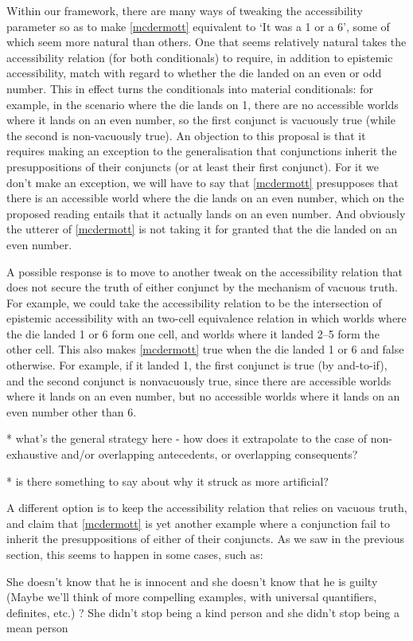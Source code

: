 \documentclass[If.tex]{subfiles}
\begin{document}
\begin{prop}
Within our framework, there are many ways of tweaking the accessibility parameter so as to make \ref{mcdermott} equivalent to ‘It was a 1 or a 6’, some of which seem more natural than others.  One that seems relatively natural takes the accessibility relation (for both conditionals) to require, in addition to epistemic accessibility, match with regard to whether the die landed on an even or odd number.  This in effect turns the conditionals into material conditionals: for example, in the scenario where the die lands on 1, there are no accessible worlds where it lands on an even number, so the first conjunct is vacuously true (while the second is non-vacuously true).  An objection to this proposal is that it requires making an exception to the generalisation that conjunctions inherit the presuppositions of their conjuncts (or at least their first conjunct).  For it we don't make an exception, we will have to say that \ref{mcdermott} presupposes that there is an accessible world where the die lands on an even number, which on the proposed reading entails that it actually lands on an even number.  And obviously the utterer of \ref{mcdermott} is not taking it for granted that the die landed on an even number.  

A possible response is to move to another tweak on the accessibility relation that does not secure the truth of either conjunct by the mechanism of vacuous truth.  For example, we could take the accessibility relation to be the intersection of epistemic accessibility with an two-cell equivalence relation in which worlds where the die landed 1 or 6 form one cell, and worlds where it landed 2--5 form the other cell.  This also makes \ref{mcdermott} true when the die landed 1 or 6 and false otherwise.  For example, if it landed 1, the first conjunct is true (by and-to-if), and the second conjunct is nonvacuously true, since there are accessible worlds where it lands on an even number, but no accessible worlds where it lands on an even number other than 6.  

* what's the general strategy here - how does it extrapolate to the case of non-exhaustive and/or overlapping antecedents, or overlapping consequents?  

* is there something to say about why it struck as more artificial?  

A different option is to keep the accessibility relation that relies on vacuous truth, and claim that \ref{mcdermott} is yet another example where a conjunction fail to inherit the presuppositions of either of their conjuncts.  As we saw in the previous section, this seems to happen in some cases, such as:
\begin{prop}
	\nitem \label{innocent}
	She doesn't know that he is innocent and she doesn't know that he is guilty
	\nitem
	(Maybe we'll think of more compelling examples, with universal quantifiers, definites, etc.)
	? She didn't stop being a kind person and she didn't stop being a mean person


\end{prop}
\end{prop}
\end{document}
